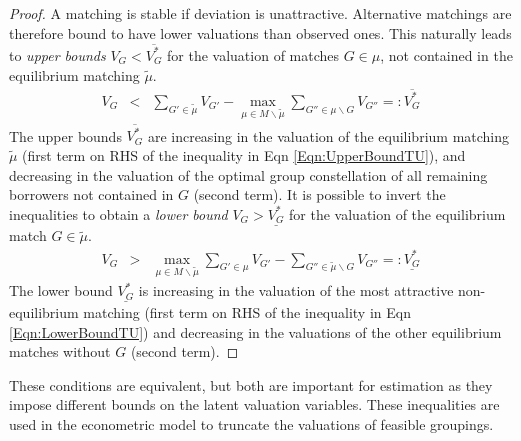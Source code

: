 \begin{proof}
A matching is stable if deviation is unattractive. Alternative matchings are therefore bound to have lower valuations than observed ones. This naturally leads to \textit{upper bounds} $V_G < \overline{V_G^*}$ for the valuation of matches $G \in \mu$, not contained in the equilibrium matching $\tilde \mu$.
\begin{eqnarray} \label{Eqn:UpperBoundTU}
V_G &<& \sum_{G' \in \tilde \mu} V_{G'}  - \max_{\mu \in M\backslash \tilde \mu} \sum_{G'' \in \mu\backslash G} V_{G''} =: \overline{V_G^*} 
\end{eqnarray}
The upper bounds $\overline{V_G^*}$ are increasing in the valuation of the equilibrium matching $\tilde \mu$ (first term on RHS of the inequality in Eqn \ref{Eqn:UpperBoundTU}), and decreasing in the valuation of the optimal group constellation of all remaining borrowers not contained in $G$ (second term). It is possible to invert the inequalities to obtain a \textit{lower bound} $V_G > \underline{V_G^*}$ for the valuation of the equilibrium match $G \in \tilde \mu$.
\begin{eqnarray} \label{Eqn:LowerBoundTU}
V_G &>& \max_{\mu \in M\backslash \tilde\mu} \sum_{G' \in \mu} V_{G'} - \sum_{G'' \in \tilde\mu \backslash G} V_{G''} =: \underline{V_G^*} 
\end{eqnarray}
The lower bound $\underline{V_G^*}$ is increasing in the valuation of the most attractive non-equilibrium matching (first term on RHS of the inequality in Eqn \ref{Eqn:LowerBoundTU}) and decreasing in the valuations of the other equilibrium matches without $G$ (second term). 
\end{proof}
\bigskip

\noindent These conditions are equivalent, but both are important for estimation as they impose different bounds on the latent valuation variables. These inequalities are used in the econometric model to truncate the valuations of feasible groupings.



